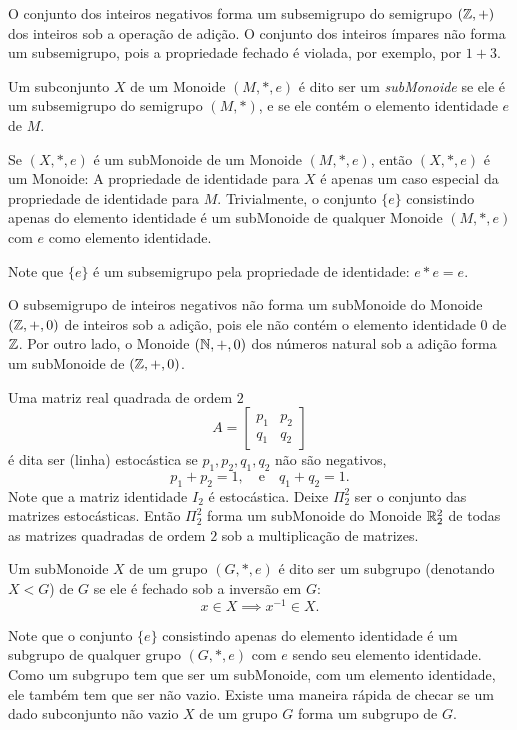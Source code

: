 \begin{exmp}
  O conjunto dos inteiros negativos forma um subsemigrupo do semigrupo $(\mathbb{Z}, +)$ dos inteiros sob a operação de adição. O conjunto dos inteiros ímpares não forma um subsemigrupo, pois a propriedade fechado é violada, por exemplo, por $1 + 3$.
\end{exmp}

\begin{definition}[SubMonoides]
  Um subconjunto $X$ de um Monoide $(M,*,e)$ é dito ser um \emph{subMonoide} se ele é um subsemigrupo do semigrupo $(M,*)$, e se ele contém o elemento identidade $e$ de $M$.
\end{definition}
Se $(X,*,e)$ é um subMonoide de um Monoide $(M,*,e)$, então $(X,*,e)$ é um Monoide: A propriedade de identidade para $X$ é apenas um caso especial da propriedade de identidade para $M$. Trivialmente, o conjunto $\{e\}$ consistindo apenas do elemento identidade é um subMonoide de qualquer Monoide $(M,*,e)$ com $e$ como elemento identidade.

Note que $\{e\}$ é um subsemigrupo pela propriedade de identidade: $e * e = e$.

\begin{exmp}
  O subsemigrupo de inteiros negativos não forma um subMonoide do Monoide $(\mathbb{Z},+,0)$ de inteiros sob a adição, pois ele não contém o elemento identidade $0$ de $\mathbb{Z}$. Por outro lado, o Monoide $(\mathbb{N}, +,0)$ dos números natural sob a adição forma um subMonoide de $(\mathbb{Z}, +,0)$.
\end{exmp}
\begin{exmp}
  Uma matriz real quadrada de ordem $2$
  $$A=\begin{bmatrix}
    p_{1} & p_{2}\\
    q_{1} & q_{2}
  \end{bmatrix}$$
  é dita ser (linha) estocástica se $p_{1},p_{2},q_{1},q_{2}$ não são negativos,
  $$p_{1} + p_{2} = 1,\quad \textrm{e}\quad q_{1} + q_{2} = 1.$$
  Note que a matriz identidade $I_{2}$ é estocástica. Deixe $\Pi_{2}^{2}$ ser o conjunto das matrizes estocásticas. Então $\Pi_{2}^{2}$ forma um subMonoide do Monoide $\mathbb{R}_{2}^{2}$ de todas as matrizes quadradas de ordem $2$ sob a multiplicação de matrizes.
\end{exmp}
\begin{definition}[Subgrupos]
  Um subMonoide $X$ de um grupo $(G,*,e)$ é dito ser um subgrupo (denotando $X < G$) de $G$ se ele é fechado sob a inversão em $G$:
  $$x\in X \implies x^{-1} \in X.$$
\end{definition}
Note que o conjunto $\{e\}$ consistindo apenas do elemento identidade é um subgrupo de qualquer grupo $(G,*,e)$ com $e$ sendo seu elemento identidade. Como um subgrupo tem que ser um subMonoide, com um elemento identidade, ele também tem que ser não vazio. Existe uma maneira rápida de checar se um dado subconjunto não vazio $X$ de um grupo $G$ forma um subgrupo de $G$.

